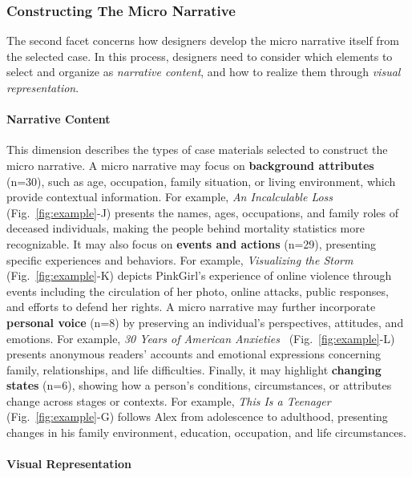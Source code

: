 \subsubsection{Constructing The Micro Narrative}
The second facet concerns how designers develop the micro narrative itself from the selected case. In this process, designers need to consider which elements to select and organize as \textit{narrative content}, and how to realize them through \textit{visual representation}.

\paragraph{\textbf{\textcolor{des}{Narrative Content}}}

This dimension describes the types of case materials selected to construct the micro narrative. A micro narrative may focus on \textbf{background attributes} (n=30), such as age, occupation, family situation, or living environment, which provide contextual information. For example, \textit{An Incalculable Loss}~\cite{nyt2020incalculable} (Fig.~\ref{fig:example}-J) presents the names, ages, occupations, and family roles of deceased individuals, making the people behind mortality statistics more recognizable. It may also focus on \textbf{events and actions} (n=29), presenting specific experiences and behaviors. For example, \textit{Visualizing the Storm}~\cite{visualizingthestorm} (Fig.~\ref{fig:example}-K) depicts PinkGirl’s experience of online violence through events including the circulation of her photo, online attacks, public responses, and efforts to defend her rights. A micro narrative may further incorporate \textbf{personal voice} (n=8) by preserving an individual’s perspectives, attitudes, and emotions. For example, \textit{30 Years of American Anxieties}~\cite{blinderman2018anxieties} (Fig.~\ref{fig:example}-L) presents anonymous readers’ accounts and emotional expressions concerning family, relationships, and life difficulties. Finally, it may highlight \textbf{changing states} (n=6), showing how a person’s conditions, circumstances, or attributes change across stages or contexts. For example, \textit{This Is a Teenager}~\cite{chang2024teenager} (Fig.~\ref{fig:example}-G) follows Alex from adolescence to adulthood, presenting changes in his family environment, education, occupation, and life circumstances.

\paragraph{\textbf{\textcolor{des}{Visual Representation}}}

